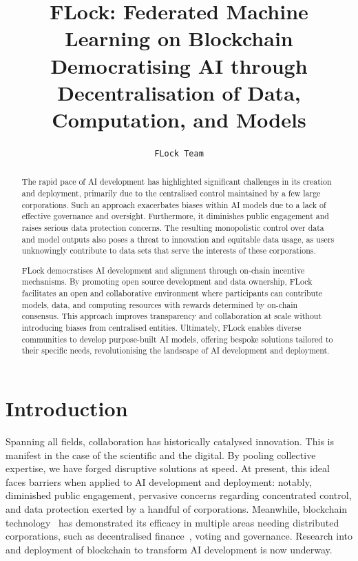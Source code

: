 \documentclass[conference]{IEEEtran}
\title{FLock: Federated Machine Learning on Blockchain \\ \vspace{0.5cm}\large 
Democratising AI through Decentralisation of Data, Computation, and Models
}
\author{\texttt{FLock Team}}
\begin{document}
\pagecolor{backgroundcolor}
\maketitle
\thispagestyle{empty}

\begin{abstract}
 The rapid pace of AI development has highlighted significant challenges in its creation and deployment, primarily due to the centralised control maintained by a few large corporations. Such an approach exacerbates biases within AI models due to a lack of effective governance and oversight. Furthermore, it diminishes public engagement and raises serious data protection concerns. The resulting monopolistic control over data and model outputs also poses a threat to innovation and equitable data usage, as users unknowingly contribute to data sets that serve the interests of these corporations.

 FLock democratises AI development and alignment through on-chain incentive mechanisms. By promoting open source development and data ownership, FLock facilitates an open and collaborative environment where participants can contribute models, data, and computing resources with rewards determined by on-chain consensus. This approach improves transparency and collaboration at scale without introducing biases from centralised entities. Ultimately, FLock enables diverse communities to develop purpose-built AI models, offering bespoke solutions tailored to their specific needs, revolutionising the landscape of AI development and deployment.
 
\end{abstract}

\section{Introduction}

Spanning all fields, collaboration has historically catalysed innovation. This is manifest in the case of the scientific and the digital. By pooling collective expertise, we have forged disruptive solutions at speed. At present, this ideal faces barriers when applied to AI development and deployment: notably, diminished public engagement, pervasive concerns regarding concentrated control, and data protection exerted by a handful of corporations. Meanwhile, blockchain technology~\cite{nakamoto2008bitcoin, wood2014ethereum} has demonstrated its efficacy in multiple areas needing distributed corporations, such as decentralised finance~\cite{werner2022sok}, voting and governance. Research into and deployment of blockchain to transform AI development is now underway. 
\end{document}
